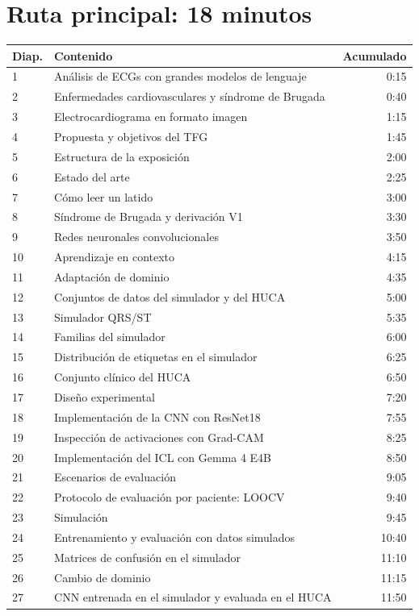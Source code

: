 \documentclass[11pt,a4paper]{article}
\begin{document}
\clearpage\section*{Ruta principal: 18 minutos}
\begin{longtable}{p{12mm}p{112mm}r}\toprule Diap. & Contenido & Acumulado\\\midrule\endhead
1 & Análisis de ECGs con grandes modelos de lenguaje & 0:15\\
2 & Enfermedades cardiovasculares y síndrome de Brugada & 0:40\\
3 & Electrocardiograma en formato imagen & 1:15\\
4 & Propuesta y objetivos del TFG & 1:45\\
5 & Estructura de la exposición & 2:00\\
6 & Estado del arte & 2:25\\
7 & Cómo leer un latido & 3:00\\
8 & Síndrome de Brugada y derivación V1 & 3:30\\
9 & Redes neuronales convolucionales & 3:50\\
10 & Aprendizaje en contexto & 4:15\\
11 & Adaptación de dominio & 4:35\\
12 & Conjuntos de datos del simulador y del HUCA & 5:00\\
13 & Simulador QRS/ST & 5:35\\
14 & Familias del simulador & 6:00\\
15 & Distribución de etiquetas en el simulador & 6:25\\
16 & Conjunto clínico del HUCA & 6:50\\
17 & Diseño experimental & 7:20\\
18 & Implementación de la CNN con ResNet18 & 7:55\\
19 & Inspección de activaciones con Grad-CAM & 8:25\\
20 & Implementación del ICL con Gemma 4 E4B & 8:50\\
21 & Escenarios de evaluación & 9:05\\
22 & Protocolo de evaluación por paciente: LOOCV & 9:40\\
23 & Simulación & 9:45\\
24 & Entrenamiento y evaluación con datos simulados & 10:40\\
25 & Matrices de confusión en el simulador & 11:10\\
26 & Cambio de dominio & 11:15\\
27 & CNN entrenada en el simulador y evaluada en el HUCA & 11:50\\

\end{longtable}
\end{document}
